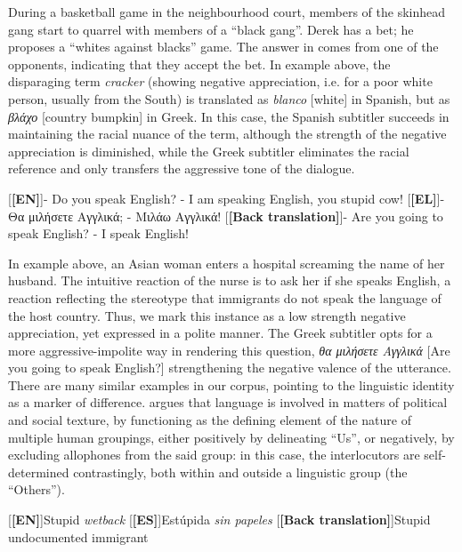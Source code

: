 \documentclass[output=paper]{LSP/langsci}
\begin{document}
During a basketball game in the neighbourhood court, members of the skinhead gang start to quarrel with members of a “black gang”. Derek has a bet; he proposes a “whites against blacks” game. The answer in  comes from one of the opponents, indicating that they accept the bet.
In example  above, the disparaging term \textit{cracker} (showing negative appreciation, i.e. for a poor white person, usually from the South) is translated as \textit{blanco} [white] in Spanish, but as \textit{βλάχο} [country bumpkin] in Greek. In this case, the Spanish subtitler succeeds in maintaining the racial nuance of the term, although the strength of the negative appreciation is diminished, while the Greek subtitler eliminates the racial reference and only transfers the aggressive tone of the dialogue. 

\ea \label{ex:2:25}
\begin{xlist}
\exi{}[\textbf{[EN]}]{- Do you speak English? - I am speaking English, you stupid cow!}
\exi{}[\textbf{[EL]}]{- Θα μιλήσετε Αγγλικά; - Μιλάω Αγγλικά!}
\exi{}[\textbf{[Back translation]}]{- Are you going to speak English? - I speak English!}
\end{xlist}
\z

In example  above, an Asian woman enters a hospital screaming the name of her husband. The intuitive reaction of the nurse is to ask her if she speaks English, a reaction reflecting the stereotype that immigrants do not speak the language of the host country. Thus, we mark this instance as a low strength negative appreciation, yet expressed in a polite manner. The Greek subtitler opts for a more aggressive-impolite way in rendering this question, \textit{θα μιλήσετε Αγγλικά} [Are you going to speak English?] strengthening the negative valence of the utterance. There are many similar examples in our corpus, pointing to the linguistic identity as a marker of difference. \citet[111]{Sella2001} argues that language is involved in matters of political and social texture, by functioning as the defining element of the nature of multiple human groupings, either positively by delineating “Us”, or negatively, by excluding allophones from the said group: in this case, the interlocutors are self-determined contrastingly, both within and outside a linguistic group (the “Others”).

\ea \label{ex:2:26}
\begin{xlist}
\exi{}[\textbf{[EN]}]{Stupid \emph{wetback}}
\exi{}[\textbf{[ES]}]{Estúpida \emph{sin papeles}}
\exi{}[\textbf{[Back translation]}]{Stupid undocumented immigrant}
\end{xlist}
\z
\end{document}
